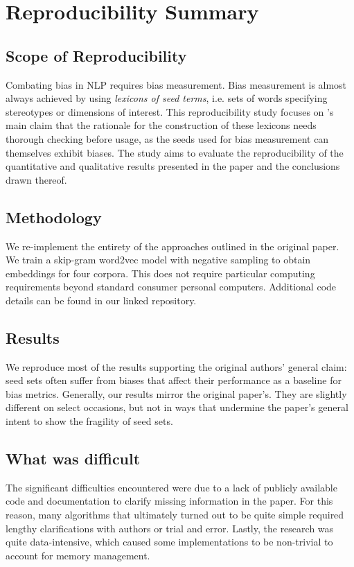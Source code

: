 \section{Reproducibility Summary}

\subsection*{Scope of Reproducibility}
Combating bias in NLP requires bias measurement. Bias measurement is almost always achieved by using \emph{lexicons of seed terms}, i.e. sets of words specifying stereotypes or dimensions of interest. This reproducibility study focuses on \citet{antoniak-mimno-2021-bad}'s main claim that the rationale for the construction of these lexicons needs thorough checking before usage, as the seeds used for bias measurement can themselves exhibit biases. The study aims to evaluate the reproducibility of the quantitative and qualitative results presented in the paper and the conclusions drawn thereof.

\subsection*{Methodology}
We re-implement the entirety of the approaches outlined in the original paper. We train a skip-gram word2vec model with negative sampling to obtain embeddings for four corpora. This does not require particular computing requirements beyond standard consumer personal computers. Additional code details can be found in our linked repository.

\subsection*{Results}
We reproduce most of the results supporting the original authors' general claim: seed sets often suffer from biases that affect their performance as a baseline for bias metrics. Generally, our results mirror the original paper's. They are slightly different on select occasions, but not in ways that undermine the paper's general intent to show the fragility of seed sets.

\subsection*{What was difficult}
The significant difficulties encountered were due to a lack of publicly available code and documentation to clarify missing information in the paper. For this reason, many algorithms that ultimately turned out to be quite simple required lengthy clarifications with authors or trial and error. Lastly, the research was quite data-intensive, which caused some implementations to be non-trivial to account for memory management.

